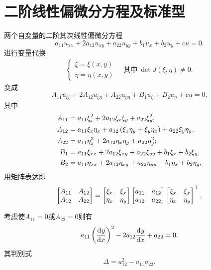 \section{二阶线性偏微分方程及标准型}
两个自变量的二阶其次线性偏微分方程
\[
	a_{11}u_{xx}+2a_{12}u_{xy}+a_{22}u_{yy}+b_1u_x+b_2u_y+cu=0.
\]
进行变量代换
\begin{align*}
	\begin{cases}
		\xi=\xi(x,y) \\
		\eta=\eta(x,y)
	\end{cases}
	\quad\text{其中}~
	\det J(\xi,\eta)\neq 0.
\end{align*}
变成
\[
	A_{11}u_{\xi\xi}+2A_{12}u_{\xi\eta}+A_{22}u_{\eta\eta}+B_1u_\xi+B_2u_\eta+cu=0.
\]
其中
\begin{align*}
	A_{11} & =a_{11}\xi_x^2+2a_{12}\xi_x\xi_y+a_{22}\xi_y^2,                          \\
	A_{12} & =a_{11}\xi_x\eta_x+a_{12}\left(\xi_x\eta_y+\xi_y\eta_x\right)+a_{22}\xi_y\eta_y, \\
	A_{22} & =a_{11}\eta_x^2+2 a_{12}\eta_x\eta_y+a_{22}\eta_y^2;                     \\
	B_1    & =a_{11}\xi_{xx}+2a_{12}\xi_{xy}+a_{22}\xi_{yy}+b_1\xi_x+b_2\xi_y,        \\
	B_2    & =a_{11}\eta_{xx}+2a_{12}\eta_{xy}+a_{22}\eta_{yy}+b_1\eta_x+b_2\eta_y,
\end{align*}
用矩阵表达即
\begin{align*}
	\begin{bmatrix}
		A_{11} & A_{12} \\
		A_{12} & A_{22}
	\end{bmatrix}=\begin{bmatrix}
		\xi_x  & \xi_x  \\
		\eta_x & \eta_y
	\end{bmatrix}\begin{bmatrix}
		a_{11} & a_{12} \\
		a_{12} & a_{22}
	\end{bmatrix}\begin{bmatrix}
		\xi_x  & \xi_x  \\
		\eta_x & \eta_y
	\end{bmatrix}^\top.
\end{align*}

考虑使$A_{11}=0$或$A_{22}=0$则有
\[
	a_{11}\left(\frac{\mathrm{d}^{{}}y}{\mathrm{d}{x}^{{}}}\right)^2-2a_{12}\frac{\mathrm{d}^{{}}y}{\mathrm{d}{x}^{{}}}+a_{22}=0.
\]
其判别式
\[
	\Delta=a_{12}^2-a_{11}a_{22}.
\]
